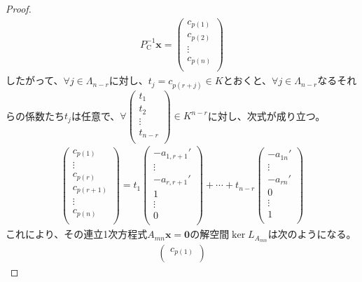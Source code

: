 \documentclass[dvipdfmx]{jsarticle}
\begin{document}
\begin{proof}
\begin{align*}
P_{\mathrm{C}}^{- 1}\mathbf{x} = \begin{pmatrix}
c_{p(1)} \\
c_{p(2)} \\
 \vdots \\
c_{p(n)} \\
\end{pmatrix}
\end{align*}
したがって、$\forall j \in \varLambda_{n - r}$に対し、$t_{j} = c_{p(r + j)} \in K$とおくと、$\forall j \in \varLambda_{n - r}$なるそれらの係数たち$t_{j}$は任意で、$\forall\begin{pmatrix}
t_{1} \\
t_{2} \\
 \vdots \\
t_{n - r} \\
\end{pmatrix} \in K^{n - r}$に対し、次式が成り立つ。
\begin{align*}
\begin{pmatrix}
c_{p(1)} \\
 \vdots \\
c_{p(r)} \\
c_{p(r + 1)} \\
 \vdots \\
c_{p(n)} \\
\end{pmatrix} = t_{1}\begin{pmatrix}
 - a_{1,r + 1}' \\
 \vdots \\
 - a_{r,r + 1}' \\
1 \\
 \vdots \\
0 \\
\end{pmatrix} + \cdots + t_{n - r}\begin{pmatrix}
 - a_{1n}' \\
 \vdots \\
 - a_{rn}' \\
0 \\
 \vdots \\
1 \\
\end{pmatrix}
\end{align*}
これにより、その連立1次方程式$A_{mn}\mathbf{x} = \mathbf{0}$の解空間$\ker L_{A_{mn}}$は次のようになる。
\begin{align*}
\begin{pmatrix}
c_{p(1)} \\

\end{pmatrix}
\end{align*}
\end{proof}
\end{document}
